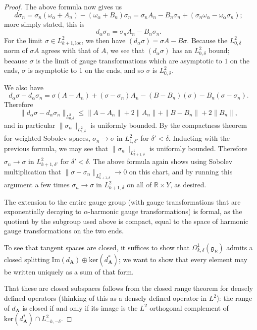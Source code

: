 \documentclass{memo-l}
\theoremstyle{definition}
\theoremstyle{remark}
\numberwithin{section}{chapter}
\numberwithin{equation}{chapter}
\begin{document}
\begin{proof}
The above formula now gives us 
$$d\sigma_n = \sigma_n (\omega_\alpha + A_n) - (\omega_\alpha + B_n) \sigma_n = \sigma_n A_n - B_n \sigma_n + (\sigma_n \omega_\alpha - \omega_\alpha \sigma_n);$$ 
more simply stated, this is 
$$d_\alpha \sigma_n = \sigma_n A_n - B_n \sigma_n.$$ 
For the limit $\sigma \in L^2_{k+1,\text{loc}}$, we then have $(d_\alpha \sigma) = \sigma A  - B\sigma$. Because the $L^2_{0,\delta}$ norm of $\sigma A$ agrees with that of $A$, we see that $(d_\alpha \sigma)$ has an $L^2_{0,\delta}$ bound; because $\sigma$ is the limit of gauge transformations which are asymptotic to $1$ on the ends, $\sigma$ is asymptotic to $1$ on the ends, and so $\sigma$ is $L^2_{0,\delta}$.

We also have $$d_\alpha\sigma - d_\alpha\sigma_n = \sigma(A-A_n) + (\sigma - \sigma_n)A_n - (B - B_n)(\sigma) - B_n(\sigma - \sigma_n).$$ Therefore $$\|d_\alpha \sigma - d_\alpha \sigma_n\|_{L^2_{0,\delta}} \leq \|A - A_n\| + 2\|A_n\| + \|B - B_n\| +2\|B_n\|,$$ and in particular $\|\sigma_n\|_{L^2_{1,\delta}}$ is uniformly bounded. By the compactness theorem for weighted Sobolev spaces, $\sigma_n \to \sigma$ in $L^2_{1,\delta'}$ for $\delta' < \delta$. Inducting with the previous formula, we may see that $\|\sigma_n\|_{L^2_{k+1,\delta}}$ is uniformly bounded. Therefore $\sigma_n \to \sigma$ in $L^2_{k+1,\delta'}$ for $\delta' < \delta$. The above formula again shows using Sobolev multiplication that $\|\sigma - \sigma_n\|_{L^2_{k+1,\delta}} \to 0$ on this chart, and by running this argument a few times $\sigma_n \to \sigma$ in $L^2_{k+1,\delta}$ on all of $\mathbb R \times Y$, as desired.

The extension to the entire gauge group (with gauge transformations that are exponentially decaying to $\alpha$-harmonic gauge transformations) is formal, as the quotient by the subgroup used above is compact, equal to the space of harmonic gauge transformations on the two ends.

To see that tangent spaces are closed, it suffices to show that $\Omega^1_{k,\delta}(\mathfrak g_E)$ admits a closed splitting $\text{Im}(d_{\mathbf{A}}) \oplus \text{ker}(d_{\mathbf{A}}^*)$; we want to show that every element may be written uniquely as a sum of that form.

That these are closed subspaces follows from the closed range theorem for densely defined operators (thinking of this as a densely defined operator in $L^2$): the range of $d_{\mathbf{A}}$ is closed if and only if its image is the $L^2$ orthogonal complement of $\text{ker}(d_{\mathbf{A}}^*) \cap L^2_{-k,-\delta}$. 


\end{proof}
\end{document}
